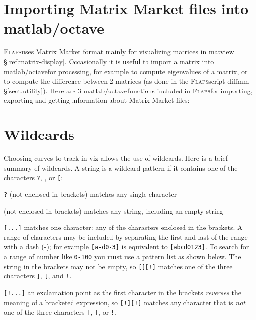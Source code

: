 \documentclass[11pt,openany,twoside]{book}
\numberwithin{equation}{section}		%
\newcommand{\Cmd}[1]{{\sf #1}}
\newcommand{\Code}[1]{{\small\tt #1}}
\newcommand{\Flaps}{\textsc{Flaps\:}}
\newcommand{\Octlab}{\Cmd{matlab}/\Cmd{octave}\:}
\newcommand{\Sectref}[1]{\S\ref{#1}}
\begin{document}
\newpage
\section{Importing Matrix Market files into \Octlab}\label{sect:mm-matlab}
\Flaps uses Matrix Market format mainly for visualizing matrices
in \Cmd{matview} \Sectref{ref:matrix-display}.
Occasionally it is useful to import a matrix into \Octlab for processing,
for example to compute eigenvalues of a matrix, or to compute the
difference between 2 matrices (as done in the \Flaps script
\Cmd{diffmm} \Sectref{sect:utility}).
Here are 3 \Octlab functions included in \Flaps for importing,
exporting and getting information about Matrix Market files: 
 		

\newpage
\section{Wildcards}\label{app:wildcards}
Choosing curves to track in \Cmd{viz} allows the use of wildcards.
Here is a brief summary of wildcards.
A string is a wildcard pattern if it contains one of the characters
\Code{?}, \Code{*}, or \verb+[+:
	\begin{description}
		\item{\Code{?}} (not enclosed in brackets) matches any single character
		\item{\Code{*}} (not enclosed in brackets) matches any string,
				including an empty string
		\item{\Code{[...]}} matches one character: any of the characters
			enclosed in the brackets. A range of characters may be included by
			separating the first and last of the range with a dash (-); for
			example \verb+[a-d0-3]+ is equivalent to \verb+[abcd0123]+.
			To search for a range of number like \verb+0-100+ you must
			use a pattern list as shown below.
			The string in the brackets may not be empty, so \verb+[][!]+ matches
			one of the three characters \verb+]+, \verb+[+, and \Code{!}.
		\item{\Code{[!...]}} an exclamation point as the first character in
			the brackets \emph{reverses} the meaning of a
			bracketed expression, so \verb+[!][!]+ matches any character that
			is \emph{not} one of the three characters \verb+]+, \verb+[+, or \Code{!}.
	\end{description}
\end{document}
